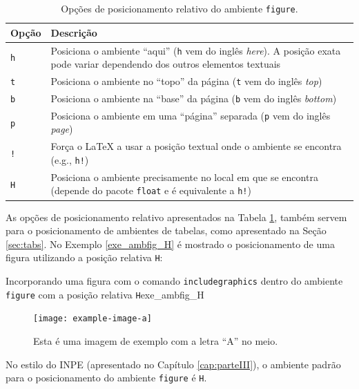\begin{table}[H]
\centering
\caption{Opções de posicionamento relativo do ambiente {\tt figure}.}
\label{tab:ambfig}
    \begin{tabular}{p{2cm}p{11cm}}
    \toprule
    \textbf{Opção} & \textbf{Descrição} \\
    \midrule
    {\tt h} & Posiciona o ambiente ``aqui'' ({\tt h} vem do inglês \textit{here}). A posição exata pode variar dependendo dos outros elementos textuais \\
    {\tt t} & Posiciona o ambiente no ``topo'' da página ({\tt t} vem do inglês \textit{top}) \\
    {\tt b} & Posiciona o ambiente na ``base'' da página ({\tt b} vem do inglês \textit{bottom}) \\
    {\tt p} & Posiciona o ambiente em uma ``página'' separada ({\tt p} vem do inglês \textit{page}) \\
    {\tt !} & Força o \LaTeX{} a usar a posição textual onde o ambiente se encontra (e.g., {\tt h!}) \\
    {\tt H} & Posiciona o ambiente precisamente no local em que se encontra (depende do pacote {\tt float} e é equivalente a {\tt h!}) \\
    \bottomrule
    \end{tabular}
\end{table}

As opções de posicionamento relativo apresentados na Tabela \ref{tab:ambfig}, também servem para o posicionamento de ambientes de tabelas, como apresentado na Seção \ref{sec:tabs}. No Exemplo \ref{exe_ambfig_H} é mostrado o posicionamento de uma figura utilizando a posição relativa {\tt H}:

\begin{texexptitled}[breakable,enhanced,middle=2mm]{Incorporando uma figura com o comando {\tt includegraphics} dentro do ambiente {\tt figure} com a posição relativa {\tt H}}{exe_ambfig_H}
\lipsum[1]
\begin{figure}[H]
    \texttt{[image: example-image-a]}
    \caption{Esta é uma imagem de exemplo com a letra ``A'' no meio.}
\end{figure}
\lipsum[2]
\end{texexptitled}

\begin{marker}
  No estilo do INPE (apresentado no Capítulo \ref{cap:parteIII}), o ambiente padrão para o posicionamento do ambiente {\tt figure} é {\tt H}.
\end{marker}

